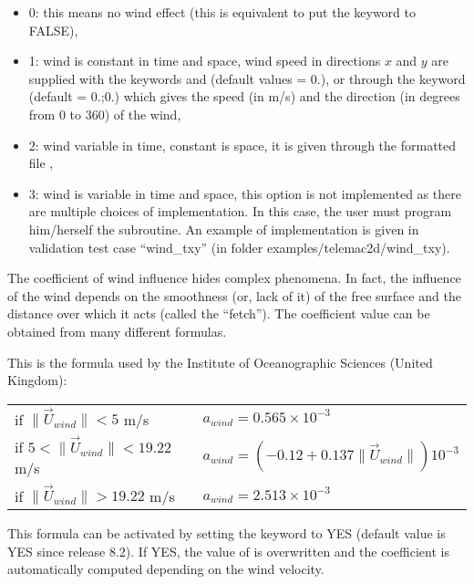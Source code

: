 \begin{itemize}
\item 0: this means no wind effect (this is equivalent to put the
 keyword  to FALSE),

\item 1: wind is constant in time and space, wind speed in directions
$x$ and $y$ are supplied with the keywords  and
 (default values = 0.),
or through the keyword  (default = 0.;0.)
which gives the speed (in m/s) and the direction (in degrees from 0 to 360) of
the wind,

\item 2: wind variable in time, constant is space,
it is given through the formatted file ,

\item 3: wind is variable in time and space, this option is not
implemented as there are multiple choices of implementation.
In this case, the user must program him/herself the  subroutine.
An example of implementation is given in validation test case ``wind\_txy''
(in folder examples/telemac2d/wind\_txy).
\end{itemize}

The coefficient of wind influence hides complex phenomena.
In fact, the influence of the wind depends on the smoothness (or, lack of it)
of the free surface and the distance over which it acts (called the ``fetch'').
The coefficient value can be obtained from many different formulas.

This is the formula used by the Institute of Oceanographic Sciences
(United Kingdom):


\begin{tabular}{ll}

if $\| \vec{U}_{wind} \| < 5$ m/s & $a_{wind}  = 0.565 \times 10^{-3}$ \\
if $5 < \| \vec{U}_{wind} \| < 19.22$ m/s &
 $a_{wind} = (- 0.12 + 0.137 \| \vec{U}_{wind} \| ) 10^{-3}$ \\
if $\| \vec{U}_{wind} \| > 19.22$ m/s & $a_{wind} = 2.513 \times 10^{-3}$ \\
\end{tabular}


This formula can be activated by setting the keyword
 to YES
(default value is YES since release 8.2).
If YES, the value of  is overwritten and
the coefficient is automatically computed depending on the wind velocity.

